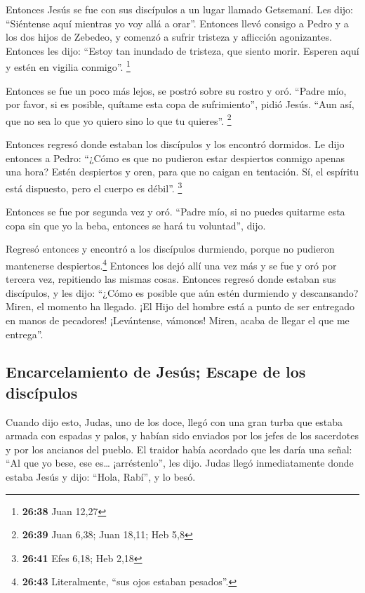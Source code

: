 Entonces Jesús se fue con sus discípulos a un lugar
llamado Getsemaní. Les dijo: ``Siéntense aquí mientras yo voy allá a
orar''.  Entonces llevó consigo a Pedro y a los dos hijos
de Zebedeo, y comenzó a sufrir tristeza y aflicción agonizantes.
 Entonces les dijo: ``Estoy tan inundado de tristeza, que
siento morir. Esperen aquí y estén en vigilia conmigo''. \footnote{\textbf{26:38}
  Juan 12,27}

 Entonces se fue un poco más lejos, se postró sobre su
rostro y oró. ``Padre mío, por favor, si es posible, quítame esta copa
de sufrimiento'', pidió Jesús. ``Aun así, que no sea lo que yo quiero
sino lo que tu quieres''. \footnote{\textbf{26:39} Juan 6,38; Juan
  18,11; Heb 5,8}

 Entonces regresó donde estaban los discípulos y los
encontró dormidos. Le dijo entonces a Pedro: ``¿Cómo es que no pudieron
estar despiertos conmigo apenas una hora?  Estén
despiertos y oren, para que no caigan en tentación. Sí, el espíritu está
dispuesto, pero el cuerpo es débil''. \footnote{\textbf{26:41} Efes
  6,18; Heb 2,18}

 Entonces se fue por segunda vez y oró. ``Padre mío, si
no puedes quitarme esta copa sin que yo la beba, entonces se hará tu
voluntad'', dijo.

 Regresó entonces y encontró a los discípulos durmiendo,
porque no pudieron mantenerse despiertos.\footnote{\textbf{26:43}
  Literalmente, ``sus ojos estaban pesados''.}  Entonces
los dejó allí una vez más y se fue y oró por tercera vez, repitiendo las
mismas cosas.  Entonces regresó donde estaban sus
discípulos, y les dijo: ``¿Cómo es posible que aún estén durmiendo y
descansando? Miren, el momento ha llegado. ¡El Hijo del hombre está a
punto de ser entregado en manos de pecadores! 
¡Levántense, vámonos! Miren, acaba de llegar el que me entrega''.

\hypertarget{encarcelamiento-de-jesuxfas-escape-de-los-discuxedpulos}{%
\subsection{Encarcelamiento de Jesús; Escape de los
discípulos}\label{encarcelamiento-de-jesuxfas-escape-de-los-discuxedpulos}}

 Cuando dijo esto, Judas, uno de los doce, llegó con una
gran turba que estaba armada con espadas y palos, y habían sido enviados
por los jefes de los sacerdotes y por los ancianos del pueblo.
 El traidor había acordado que les daría una señal: ``Al
que yo bese, ese es\ldots{} ¡arréstenlo'', les dijo. 
Judas llegó inmediatamente donde estaba Jesús y dijo: ``Hola, Rabí'', y
lo besó.

